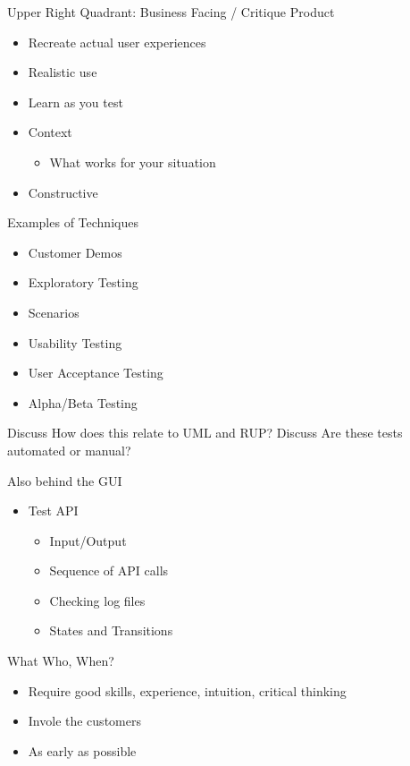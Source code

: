 \documentclass[10pt,t,a4paper]{beamer}
\begin{document}
\begin{frame}[label=sec-8]{Upper Right Quadrant: Business Facing / Critique Product}
\begin{itemize}
\item Recreate actual user experiences
\item Realistic use
\item Learn as you test
\item Context
\begin{itemize}
\item What works for your situation
\end{itemize}
\item Constructive
\end{itemize}
\begin{block}{Examples of Techniques}
\begin{itemize}
\item Customer Demos
\item Exploratory Testing
\item Scenarios
\item Usability Testing
\item User Acceptance Testing
\item Alpha/Beta Testing
\end{itemize}

\alert{Discuss} How does this relate to UML and RUP?
\alert{Discuss} Are these tests automated or manual?
\end{block}
\end{frame}
\begin{frame}[label=sec-9]{Also behind the GUI}
\begin{itemize}
\item Test API
\begin{itemize}
\item Input/Output
\item Sequence of API calls
\item Checking log files
\item States and Transitions
\end{itemize}
\end{itemize}
\end{frame}
\begin{frame}[label=sec-10]{What Who, When?}
\begin{itemize}
\item Require good skills, experience, intuition, critical thinking
\item Invole the customers
\item As early as possible
\end{itemize}
\end{frame}
\end{document}
